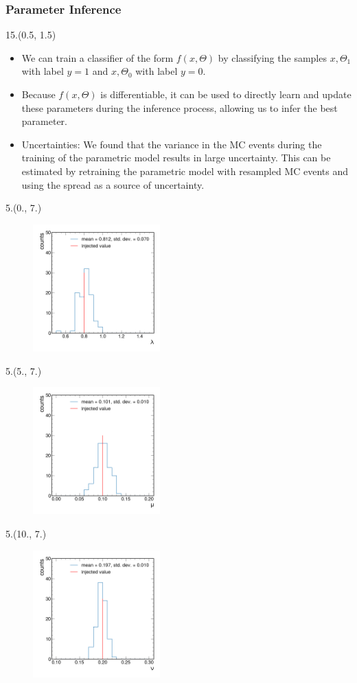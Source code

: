 \documentclass[10pt, xcolor={dvipsnames}, sans, mathserif, aspectratio=169]{beamer}
\newenvironment{List}[2]
{\begin{textblock}{#1}#2
\begin{itemize}}
{\end{itemize}
\end{textblock}}
\newenvironment{Pic}[2]
{\begin{textblock}{#1}#2
\begin{figure}}
{\end{figure}
\end{textblock}}
\begin{document}
\begin{frame}
\frametitle{Parameter Inference}

\begin{List}{15.}{(0.5, 1.5)}

	\item We can train a classifier of the form $f(x, \Theta)$ by classifying the samples ${x, \Theta_{1}}$ with label $y = 1$ and ${x, \Theta_{0}}$ with label $y = 0$.
	
	\item Because $f(x, \Theta)$ is differentiable, it can be used to directly learn and update these parameters during the inference process, allowing us to infer the best parameter.
	
	\item Uncertainties: We found that the variance in the MC events during the training of the parametric model results in large uncertainty. This can be estimated by retraining the parametric model with resampled MC events and using the spread as a source of uncertainty.
\end{List}

\begin{Pic}{5.}{(0., 7.)}
	\includegraphics[width=4.9cm]{lambda_var.png}
\end{Pic}
	
\begin{Pic}{5.}{(5., 7.)}
	\includegraphics[width=4.9cm]{mu_var.png}
\end{Pic}

\begin{Pic}{5.}{(10., 7.)}
	\includegraphics[width=4.9cm]{nu_var.png}
\end{Pic}


\end{frame}
\end{document}
